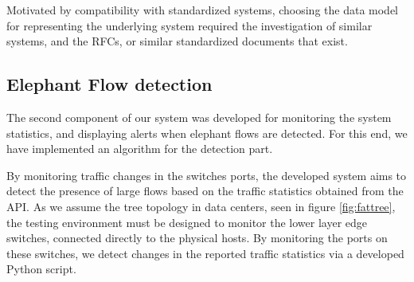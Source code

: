 \par Motivated by compatibility with standardized systems, choosing the data model for representing the underlying system required the investigation of similar 
systems, and the RFCs, or similar standardized documents that exist. 

\subsection {Elephant Flow detection}

The second component of our system was developed for monitoring the system statistics, and displaying alerts when elephant flows are detected. For this end, we have
implemented an algorithm for the detection part. 

\par By monitoring traffic changes in the switches ports, the developed system aims to detect the presence of large flows based on the traffic statistics obtained
from the API. As we assume the tree topology in data centers, seen in figure \ref{fig:fattree}, the testing environment must be designed to monitor the lower layer
edge switches, connected directly to the physical hosts. By monitoring the ports on these switches, we detect changes in the reported traffic statistics via a
developed Python script.
